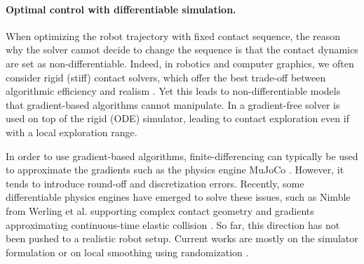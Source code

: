 


\paragraph{Optimal control with differentiable simulation.}

When optimizing the robot trajectory with fixed contact sequence, the reason why the solver cannot decide to change the sequence is that the contact dynamics are set as non-differentiable. 
Indeed, in robotics and computer graphics, we often consider rigid (stiff) contact solvers, which offer the best trade-off between algorithmic efficiency and realism \cite{pybullet_coumans2019}.
Yet this leads to non-differentiable models that gradient-based algorithms cannot manipulate. 
In \cite{hamalainen_2015} a gradient-free solver is used on top of the rigid (ODE) simulator, leading to contact exploration even if with a local exploration range.

In order to use gradient-based algorithms, finite-differencing can typically be used to approximate the gradients such as the physics engine MuJoCo \cite{mujoco}. However, it tends to introduce round-off and discretization errors.
Recently, some differentiable physics engines have emerged to solve these issues, such as Nimble from Werling et al. supporting complex contact geometry and gradients approximating continuous-time elastic collision \cite{werling_2021}.
So far, this direction has not been pushed to a realistic robot setup. 
Current works are mostly on the simulator formulation \cite{chainqueen_2019, difftaichi_2019} or on local smoothing using randomization \cite{tedrake_2022_differentiable, carpentier_fix_differentiable_OC}.



